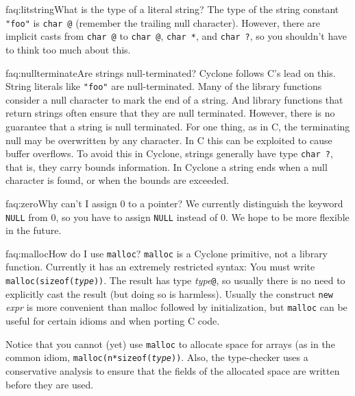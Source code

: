 \begin{faqa}{faq:litstring}{What is the type of a literal string?}
The type of the string constant \texttt{"foo"} is \texttt{char @\rb} (remember the trailing null character).  However, there are implicit
casts from \texttt{char @\rb} to \texttt{char @\rb},
\texttt{char *\rb}, and \texttt{char ?}, so you shouldn't have to
think too much about this.
\end{faqa}

\begin{faqa}{faq:nullterminate}{Are strings null-terminated?}
Cyclone follows C's lead on this.  String literals like \texttt{"foo"}
are null-terminated.  Many of the library functions consider a null
character to mark the end of a string.  And library functions that
return strings often ensure that they are null terminated.  However,
there is no guarantee that a string is null terminated.  For one
thing, as in C, the terminating null may be overwritten by any
character.  In C this can be exploited to cause buffer overflows.  To
avoid this in Cyclone, strings generally have type \texttt{char ?},
that is, they carry bounds information.  In Cyclone a string ends when
a null character is found, or when the bounds are exceeded.
\end{faqa}

\begin{faqa}{faq:zero}{Why can't I assign 0 to a pointer?}
We currently distinguish the keyword \texttt{NULL} from 0, so you have
to assign \texttt{NULL} instead of 0.  We hope to be more flexible in
the future.
\end{faqa}

\begin{faqa}{faq:malloc}{How do I use \texttt{malloc}?}
\texttt{malloc} is a Cyclone primitive, not a library function.
Currently it has an extremely restricted syntax: You must write
\texttt{malloc(sizeof(\textit{type}))}.  The result has type
\textit{type}\texttt{@}, so usually there is no need to explicitly
cast the result (but doing so is harmless).  Usually the construct
\texttt{new} \textit{expr} is more convenient than malloc followed by
initialization, but \texttt{malloc} can be useful for certain idioms
and when porting C code.

Notice that you cannot (yet) use \texttt{malloc} to allocate space for
arrays (as in the common idiom, \texttt{malloc(n*sizeof({\it type}))}.
Also, the type-checker uses a conservative analysis to ensure that the
fields of the allocated space are written before they are used.
\end{faqa}

